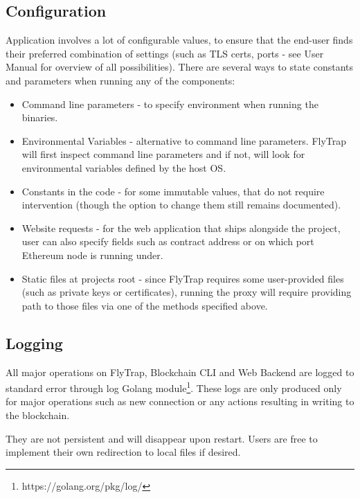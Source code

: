 \subsection{Configuration}
Application involves a lot of configurable values, to ensure that the end-user finds their preferred combination of settings (such as TLS certs, ports - see User Manual for overview of all possibilities). There are several ways to state constants and parameters when running any of the components:
\begin{itemize}
    \item Command line parameters - to specify environment when running the binaries.
    \item Environmental Variables - alternative to command line parameters. FlyTrap will first inspect command line parameters and if not, will look for environmental variables defined by the host OS.
    \item Constants in the code - for some immutable values, that do not require intervention (though the option to change them still remains documented).
    \item Website requests - for the web application that ships alongside the project, user can also specify fields such as contract address or on which port Ethereum node is running under.
    \item Static files at projects root - since FlyTrap requires some user-provided files (such as private keys or certificates), running the proxy will require providing path to those files via one of the methods specified above.
\end{itemize}
\subsection{Logging}
All major operations on FlyTrap, Blockchain CLI and Web Backend are logged to standard error through log Golang module\footnote{https://golang.org/pkg/log/}. These logs are only produced only for major operations such as new connection or any actions resulting in writing to the blockchain.

They are not persistent and will disappear upon restart. Users are free to implement their own redirection to local files if desired.

